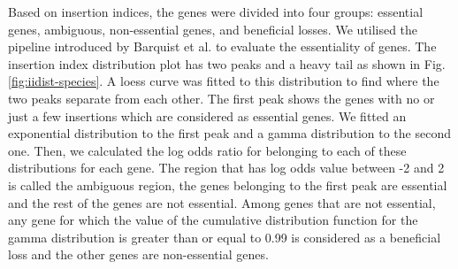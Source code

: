 \documentclass[12pt,letterpaper]{article}
\begin{document}
Based on insertion indices, the genes were divided into four groups: essential genes, ambiguous, non-essential genes, and beneficial losses. We utilised the pipeline introduced by Barquist et al.\@ \cite{barquist_tradis_2016} to evaluate the essentiality of genes. The insertion index distribution plot has two peaks and a heavy tail as shown in Fig.\@ \ref{fig:iidist-species}. A loess curve was fitted to this distribution to find where the two peaks separate from each other. The first peak shows the genes with no or just a few insertions which are considered as essential genes. We fitted an exponential distribution to the first peak and a gamma distribution to the second one. Then, we calculated the log odds ratio for belonging to each of these distributions for each gene. The region that has log odds value between -2 and 2 is called the ambiguous region, the genes belonging to the first peak are essential and the rest of the genes are not essential. Among genes that are not essential, any gene for which the value of the cumulative distribution function for the gamma distribution is greater than or equal to 0.99 is considered as a beneficial loss and the other genes are non-essential genes.
\end{document}
